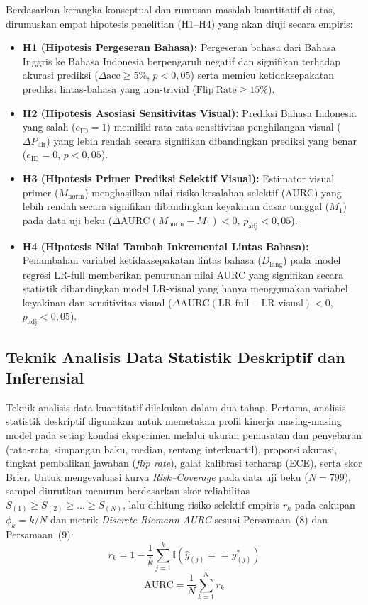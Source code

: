 \documentclass[a4paper,10pt,twoside]{article}
\begin{document}
Berdasarkan kerangka konseptual dan rumusan masalah kuantitatif di atas, dirumuskan empat hipotesis penelitian (H1–H4) yang akan diuji secara empiris:
\begin{itemize}[leftmargin=*]
    \item \textbf{H1 (Hipotesis Pergeseran Bahasa):} Pergeseran bahasa dari Bahasa Inggris ke Bahasa Indonesia berpengaruh negatif dan signifikan terhadap akurasi prediksi ($\Delta \mathrm{acc} \ge 5\%$, $p < 0{,}05$) serta memicu ketidaksepakatan prediksi lintas-bahasa yang non-trivial ($\mathrm{Flip\ Rate} \ge 15\%$).
    \item \textbf{H2 (Hipotesis Asosiasi Sensitivitas Visual):} Prediksi Bahasa Indonesia yang salah ($e_{\mathrm{ID}} = 1$) memiliki rata-rata sensitivitas penghilangan visual ($\Delta P_{\mathrm{dir}}$) yang lebih rendah secara signifikan dibandingkan prediksi yang benar ($e_{\mathrm{ID}} = 0$, $p < 0{,}05$).
    \item \textbf{H3 (Hipotesis Primer Prediksi Selektif Visual):} Estimator visual primer ($M_{\mathrm{norm}}$) menghasilkan nilai risiko kesalahan selektif (AURC) yang lebih rendah secara signifikan dibandingkan keyakinan dasar tunggal ($M_1$) pada data uji beku ($\Delta \mathrm{AURC}(M_{\mathrm{norm}} - M_1) < 0$, $p_{\mathrm{adj}} < 0{,}05$).
    \item \textbf{H4 (Hipotesis Nilai Tambah Inkremental Lintas Bahasa):} Penambahan variabel ketidaksepakatan lintas bahasa ($D_{\mathrm{lang}}$) pada model regresi LR-full memberikan penurunan nilai AURC yang signifikan secara statistik dibandingkan model LR-visual yang hanya menggunakan variabel keyakinan dan sensitivitas visual ($\Delta \mathrm{AURC}(\mathrm{LR\text{-}full} - \mathrm{LR\text{-}visual}) < 0$, $p_{\mathrm{adj}} < 0{,}05$).
\end{itemize}

\subsection{Teknik Analisis Data Statistik Deskriptif dan Inferensial}
Teknik analisis data kuantitatif dilakukan dalam dua tahap. Pertama, analisis statistik deskriptif digunakan untuk memetakan profil kinerja masing-masing model pada setiap kondisi eksperimen melalui ukuran pemusatan dan penyebaran (rata-rata, simpangan baku, median, rentang interkuartil), proporsi akurasi, tingkat pembalikan jawaban (\textit{flip rate}), galat kalibrasi terharap (ECE), serta skor Brier. Untuk mengevaluasi kurva \textit{Risk--Coverage} pada data uji beku ($N = 799$), sampel diurutkan menurun berdasarkan skor reliabilitas $S_{(1)} \ge S_{(2)} \ge \dots \ge S_{(N)}$, lalu dihitung risiko selektif empiris $r_k$ pada cakupan $\phi_k = k/N$ dan metrik \textit{Discrete Riemann AURC} sesuai Persamaan~(8) dan Persamaan~(9):
\begin{equation}
r_k = 1 - \frac{1}{k} \sum_{j=1}^k \mathbb{I}(\hat{y}_{(j)} == y_{(j)}^*)
\end{equation}
\begin{equation}
\mathrm{AURC} = \frac{1}{N} \sum_{k=1}^N r_k
\end{equation}
\end{document}
